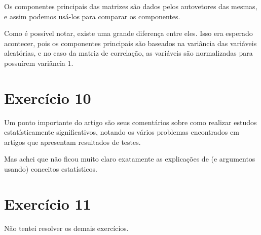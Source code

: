 \documentclass[a4paper,11pt]{article}
\begin{document}
Os componentes principais das matrizes são dados pelos autovetores das mesmas, e assim podemos
usá-los para comparar os componentes. 

Como é possível notar, existe uma grande diferença entre eles. Isso era esperado acontecer,
pois os componentes principais são baseados na variância das variáveis aleatórias, e no caso
da matriz de correlação, as variáveis são normalizadas para possuírem variância 1.

\section{Exercício 10}

Um ponto importante do artigo são seus comentários sobre como realizar estudos estatísticamente significativos,
notando os vários problemas encontrados em artigos que apresentam resultados de testes.

Mas achei que não ficou muito claro exatamente as explicações de (e argumentos usando) conceitos estatísticos. 


\section{Exercício 11}

Não tentei resolver os demais exercícios.
\end{document}
